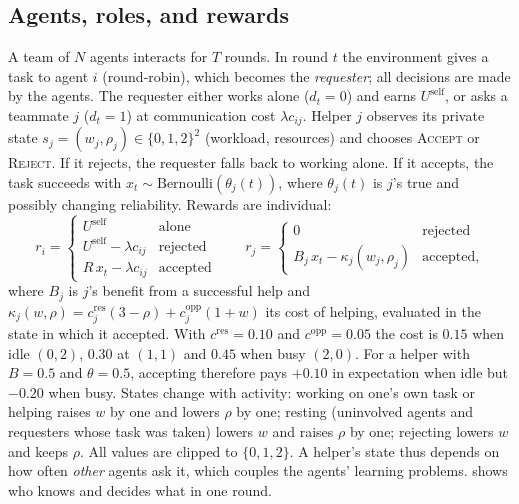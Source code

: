 \documentclass{article}
\newcommand{\Uself}{U^{\mathrm{self}}}
\begin{document}
\subsection{Agents, roles, and rewards}
A team of $N$ agents interacts for $T$ rounds. In round $t$ the environment gives a task to agent $i$ (round-robin), which becomes the \emph{requester}; all decisions are made by the agents. The requester either works alone ($d_t=0$) and earns $\Uself$, or asks a teammate $j$ ($d_t=1$) at communication cost $\lambda c_{ij}$. Helper $j$ observes its private state $s_j=(w_j,\rho_j)\in\{0,1,2\}^2$ (workload, resources) and chooses \textsc{Accept} or \textsc{Reject}. If it rejects, the requester falls back to working alone. If it accepts, the task succeeds with $x_t\sim\mathrm{Bernoulli}(\theta_j(t))$, where $\theta_j(t)$ is $j$'s true and possibly changing reliability. Rewards are individual:
\begin{equation}
r_i=\begin{cases}\Uself & \text{alone}\\ \Uself-\lambda c_{ij} & \text{rejected}\\ R\,x_t-\lambda c_{ij} & \text{accepted}\end{cases}\qquad
r_j=\begin{cases}0 & \text{rejected}\\ B_j\,x_t-\kappa_j(w_j,\rho_j) & \text{accepted,}\end{cases}
\label{eq:rewards}
\end{equation}
where $B_j$ is $j$'s benefit from a successful help and $\kappa_j(w,\rho)=c^{\mathrm{res}}_j(3-\rho)+c^{\mathrm{opp}}_j(1+w)$ its cost of helping, evaluated in the state in which it accepted. With $c^{\mathrm{res}}=0.10$ and $c^{\mathrm{opp}}=0.05$ the cost is $0.15$ when idle $(0,2)$, $0.30$ at $(1,1)$ and $0.45$ when busy $(2,0)$. For a helper with $B=0.5$ and $\theta=0.5$, accepting therefore pays $+0.10$ in expectation when idle but $-0.20$ when busy. States change with activity: working on one's own task or helping raises $w$ by one and lowers $\rho$ by one; resting (uninvolved agents and requesters whose task was taken) lowers $w$ and raises $\rho$ by one; rejecting lowers $w$ and keeps $\rho$. All values are clipped to $\{0,1,2\}$. A helper's state thus depends on how often \emph{other} agents ask it, which couples the agents' learning problems.  shows who knows and decides what in one round.
\end{document}
